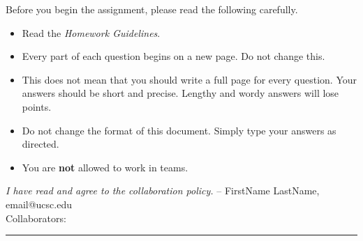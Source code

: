 \documentclass[11pt]{article}
\begin{document}
\noindent
Before you begin the assignment, please read the following carefully.
\begin{itemize}
    \item Read the \emph{Homework Guidelines}.
    \item Every part of each question begins on a new page. Do not change this.
    \item This does not mean that you should write a full page for every question. Your answers should be short and precise. Lengthy and wordy answers will lose points.
    \item Do not change the format of this document. Simply type your answers as directed.
    \item You are \textbf{not} allowed to work in teams.
\end{itemize}
\emph{I have read and agree to the collaboration policy.}  -- FirstName LastName, email@ucsc.edu
\\
Collaborators: %
\\
\hrule
\end{document}

